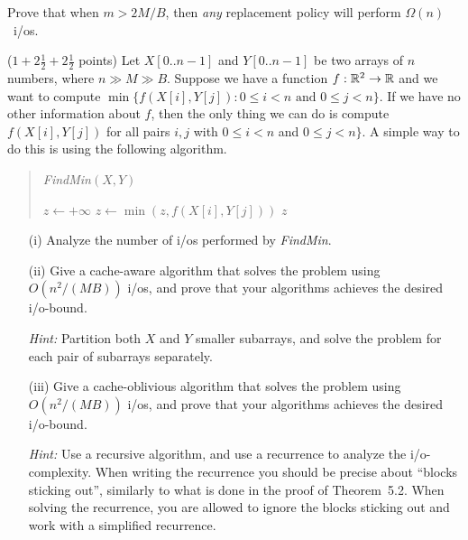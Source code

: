 \documentclass{article}
\newcommand{\Reals}{{\Bbb R}}
\renewcommand{\leq}{\leqslant}
\newcommand{\io}{{\sc i/o}\xspace}
\newcommand{\ios}{{\io}s\xspace}
\newcounter{rcounter}
\newenvironment{rlist}%
{\begin{list}{\setnr-\arabic{rcounter}}{\usecounter{rcounter}}}{\end{list}}
\begin{document}
\begin{rlist}
        Prove that when $m>2M/B$, then \emph{any} replacement policy will perform $\Omega(n)$~\ios.
        
        
        \item ($1+2\frac{1}{2}+2\frac{1}{2}$ points)
        Let $X[0..n-1]$ and $Y[0..n-1]$ be two arrays of $n$ numbers, where $n \gg M \gg B$. Suppose we have a function $f:\Reals^2\rightarrow \Reals$ and we want to compute $\min \{ f(X[i],Y[j]) : 0\leq i <n \mbox{ and } 0\leq j <n \}$. If we have no other information about $f$, then the only thing we can do is compute $f(X[i],Y[j])$ for all pairs $i,j$ with $0\leq i <n$ and $0\leq j <n \}$. A simple way to do this is using the following algorithm.
        \begin{quotation}
            \noindent
            \emph{FindMin}$(X,Y)$ \\[-5mm]
            \begin{algorithmic}[1]
                \State $z \gets +\infty$
                \State $z \gets \min ( z, f(X[i],Y[j]) )$
                \EndFor
                \EndFor
                \State \Return $z$
            \end{algorithmic}
        \end{quotation}
        \begin{enumerate}
            \item[(i)]
            Analyze the number of \ios performed by \emph{FindMin}.
            \item[(ii)]
            Give a cache-aware algorithm that solves the problem using $O(n^2/(MB))$ \ios, and prove that your algorithms achieves the desired \io-bound.
            
            \emph{Hint:} Partition both $X$ and $Y$ smaller subarrays, and solve the problem for each pair of subarrays separately.
            \item[(iii)]
            Give a cache-oblivious algorithm that solves the problem using $O(n^2/(MB))$ \ios, and prove that your algorithms achieves the desired \io-bound.
            
            \emph{Hint:} Use a recursive algorithm, and use a recurrence to analyze the \io-complexity. When writing the recurrence you should be precise about ``blocks sticking out'', similarly to what is done in the proof of Theorem~5.2. When solving the recurrence, you are allowed to ignore the blocks sticking out and work with a simplified recurrence.
        \end{enumerate}
        

\end{rlist}
\end{document}
